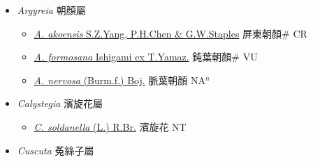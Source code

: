 
  \begin{itemize}
 \item[] \textit{Argyreia} 朝顏屬
                    
  \begin{itemize}
        \item[] \href{http://www.theplantlist.org/tpl1.1/search?q=Argyreia+akoensis}{\textit{A. akoensis} S.Z.Yang, P.H.Chen \& G.W.Staples}   屏東朝顏\# CR
        \item[] \href{http://www.theplantlist.org/tpl1.1/search?q=Argyreia+formosana}{\textit{A. formosana} Ishigami ex T.Yamaz.}   鈍葉朝顏\# VU
        \item[] \href{http://www.theplantlist.org/tpl1.1/search?q=Argyreia+nervosa}{\textit{A. nervosa} (Burm.f.) Boj.}   脈葉朝顏 NA$^n$
  \end{itemize}
 \item[] \textit{Calystegia} 濱旋花屬
                    
  \begin{itemize}
        \item[] \href{http://www.theplantlist.org/tpl1.1/search?q=Calystegia+soldanella}{\textit{C. soldanella} (L.) R.Br.}   濱旋花 NT
  \end{itemize}
 \item[] \textit{Cuscuta} 菟絲子屬
                    

\end{itemize}
